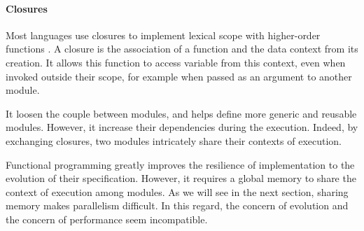 \paragraph{Closures}

Most languages use closures to implement lexical scope with higher-order functions \cite{Sussman1998}.
A closure is the association of a function and the data context from its creation.
It allows this function to access variable from this context, even when invoked outside their scope, for example when passed as an argument to another module.

It loosen the couple between modules, and helps define more generic and reusable modules.
However, it increase their dependencies during the execution.
Indeed, by exchanging closures, two modules intricately share their contexts of execution.

Functional programming greatly improves the resilience of implementation to the evolution of their specification.
However, it requires a global memory to share the context of execution among modules.
As we will see in the next section, sharing memory makes parallelism difficult.
In this regard, the concern of evolution and the concern of performance seem incompatible.


\endinput



\subsubsection{Modularity based on Design Decisions}

Designing Software for ease of extension and contraction \cite{Parnas1979}

Design Rules: The Power of Modularity Volume 1 \cite{Baldwin1999}
A reference book, but can't get it.

Design Rule Hierarchies and Parallelism in Software Development Tasks \cite{Wong2009}
Organize design, so that modules can be developed in parallel, without communication between teams working on independent modules.
Identification of coordination requirements \cite{Cataldo2006}
About the communication requirement between teams working on different modules.

If the teams working on different modules need not to communicate, then the same person working on different modules at different times, need not to remember any dependencies : both conserves locality of reasoning.

















